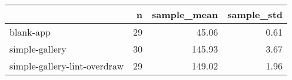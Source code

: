 \begin{tabular}{lrrr}
\toprule
{} &   n &  sample\_mean &  sample\_std \\
\midrule
blank-app                    &  29 &        45.06 &        0.61 \\
simple-gallery               &  30 &       145.93 &        3.67 \\
simple-gallery-lint-overdraw &  29 &       149.02 &        1.96 \\
\bottomrule
\end{tabular}
